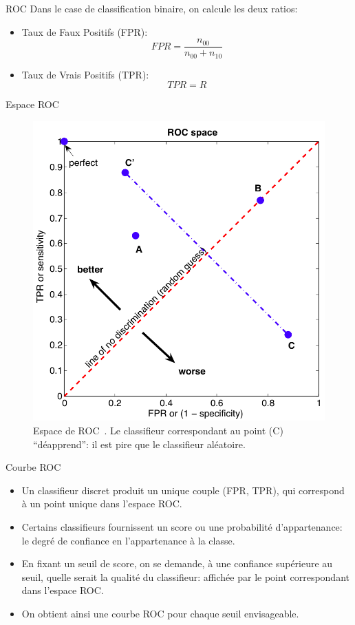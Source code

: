 \documentclass[8pt]{beamer}
\begin{document}
			\begin{frame}{ROC}
				Dans le case de classification binaire, on calcule les deux ratios:
				\begin{itemize}
					\item<1-> Taux de Faux Positifs (FPR):
						\begin{equation}
							FPR = \frac{n_{00}}{n_{00} + n_{10}}
						\end{equation}
					\item<2-> Taux de Vrais Positifs (TPR):
						\begin{equation}
							TPR = R
						\end{equation}
				\end{itemize}
			\end{frame}
			\begin{frame}{Espace ROC}
				\begin{figure}[H]
					\includegraphics[width=.45\textwidth]{images/samples/roc.png}
					\caption*{Espace de ROC~\cite{schrynemackers2009using}. Le classifieur correspondant au point (C) ``déapprend'': il est pire que le classifieur aléatoire.}
				\end{figure}
			\end{frame}
			\begin{frame}{Courbe ROC}
				\begin{itemize}
					\item<1-> Un classifieur discret produit un unique couple (FPR, TPR), qui correspond à un point unique dans l’espace ROC.
					\item<2-> Certains classifieurs fournissent un score ou une probabilité d’appartenance: le degré de confiance en l’appartenance à la classe.
					\item<3-> En fixant un seuil de score, on se demande, à une confiance supérieure au seuil, quelle serait la qualité du classifieur: affichée par le point correspondant dans l'espace ROC.
					\item<4-> On obtient ainsi une courbe ROC pour chaque seuil envisageable.
				\end{itemize}
			\end{frame}
\end{document}
